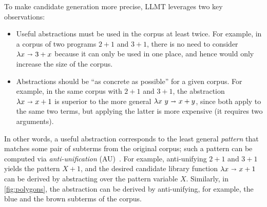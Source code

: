 %
To make candidate generation more precise,
 LLMT leverages two key observations:
\begin{itemize}
    \item
    Useful abstractions must be used in the corpus at least twice.
    For example, in a corpus of two programs $2 + 1$ and $3 + 1$,
    there is no need to consider $\lambda x \ \mathbf{\shortrightarrow}\  3 + x$
    because it can only be used in one place,
    and hence would only increase the size of the corpus.
    \item
    Abstractions should be ``as concrete as possible'' for a given corpus.
    For example,
     in the same corpus with $2 + 1$ and $3 + 1$,
     the abstraction $\lambda x \ \mathbf{\shortrightarrow}\  x + 1$
     is superior to the more general
     $\lambda x\ y \ \mathbf{\shortrightarrow}\  x + y$,
     since both apply to the same two terms,
     but applying the latter is more expensive (it requires two arguments).
\end{itemize}
%
In other words, a useful abstraction corresponds to the least general \emph{pattern}
that matches some pair of subterms from the original corpus;
such a pattern can be computed via \emph{anti-unification} (AU)~\cite{plotkin1970lattice}.
%
For example, anti-unifying $2 + 1$ and $3 + 1$
  yields the pattern $X + 1$,
  and the desired candidate library function $\lambda x \ \mathbf{\shortrightarrow}\  x + 1$
  can be derived by abstracting over the pattern variable $X$.
%
Similarly, in \autoref{fig:polygons}, the abstraction  can be derived
 by anti-unifying, for example, the blue and the brown subterms of the corpus.
%

